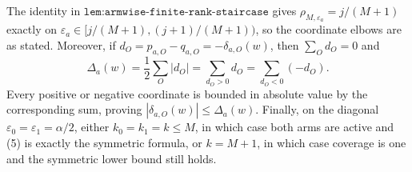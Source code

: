 The identity in \(\texttt{lem:armwise-finite-rank-staircase}\) gives \(\rho_{M,\varepsilon_a}=j/(M+1)\) exactly on \(\varepsilon_a\in[j/(M+1),(j+1)/(M+1))\), so the coordinate elbows are as stated. Moreover, if \(d_O=p_{a,O}-q_{a,O}=-\delta_{a,O}(w)\), then \(\sum_Od_O=0\) and
\[
\Delta_a(w)=\frac12\sum_O|d_O|=\sum_{d_O>0}d_O=\sum_{d_O<0}(-d_O).
\]
Every positive or negative coordinate is bounded in absolute value by the corresponding sum, proving \(|\delta_{a,O}(w)|\le\Delta_a(w)\). Finally, on the diagonal \(\varepsilon_0=\varepsilon_1=\alpha/2\), either \(k_0=k_1=k\le M\), in which case both arms are active and (5) is exactly the symmetric formula, or \(k=M+1\), in which case coverage is one and the symmetric lower bound still holds.